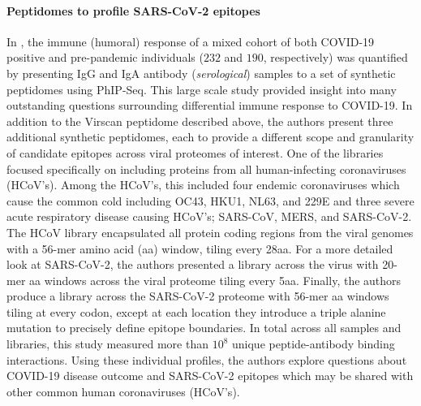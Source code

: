 \documentclass{article}
\begin{document}
\paragraph{Peptidomes to profile SARS-CoV-2 epitopes}
In \citet{Shrock2020}, the immune (humoral) response of a mixed cohort of both COVID-19 positive and pre-pandemic individuals ($232$ and $190$, respectively) was quantified by presenting IgG and IgA antibody (\textit{serological}) samples to a set of synthetic peptidomes using PhIP-Seq.
This large scale study provided insight into many outstanding questions surrounding differential immune response to COVID-19.
In addition to the Virscan peptidome described above, the authors present three additional synthetic peptidomes, each to provide a different scope and granularity of candidate epitopes across viral proteomes of interest.
One of the libraries focused specifically on including proteins from all human-infecting coronaviruses (HCoV's).
Among the HCoV's, this included four endemic coronaviruses which cause the common cold including OC43, HKU1, NL63, and 229E and three severe acute respiratory disease causing HCoV's; SARS-CoV, MERS, and SARS-CoV-2.
The HCoV library encapsulated all protein coding regions from the viral genomes with a 56-mer amino acid (aa) window, tiling every 28aa.
For a more detailed look at SARS-CoV-2, the authors presented a library across the virus with 20-mer aa windows across the viral proteome tiling every 5aa.
Finally, the authors produce a library across the SARS-CoV-2 proteome with 56-mer aa windows tiling at every codon, except at each location they introduce a triple alanine mutation to precisely define epitope boundaries.
In total across all samples and libraries, this study measured more than $10^{8}$ unique peptide-antibody binding interactions.
Using these individual profiles, the authors explore questions about COVID-19 disease outcome and SARS-CoV-2 epitopes which may be shared with other common human coronaviruses (HCoV's).
\end{document}

